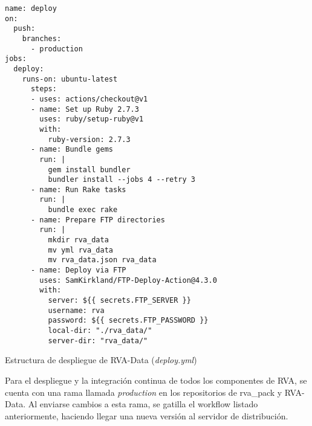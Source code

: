 \begin{longlisting}
  \begin{verbatim}  
name: deploy
on:
  push:
    branches:
      - production
jobs:
  deploy:
    runs-on: ubuntu-latest
      steps:
      - uses: actions/checkout@v1
      - name: Set up Ruby 2.7.3
        uses: ruby/setup-ruby@v1
        with:
          ruby-version: 2.7.3
      - name: Bundle gems
        run: |
          gem install bundler
          bundler install --jobs 4 --retry 3
      - name: Run Rake tasks
        run: |
          bundle exec rake
      - name: Prepare FTP directories
        run: |
          mkdir rva_data
          mv yml rva_data
          mv rva_data.json rva_data
      - name: Deploy via FTP
        uses: SamKirkland/FTP-Deploy-Action@4.3.0
        with:
          server: ${{ secrets.FTP_SERVER }}
          username: rva
          password: ${{ secrets.FTP_PASSWORD }}
          local-dir: "./rva_data/"
          server-dir: "rva_data/"
  \end{verbatim}
  \caption[Workflow de Despleigue]{Estructura de despliegue de RVA-Data (\textit{deploy.yml})}
\end{longlisting}

\newpage

Para el despliegue y la integración continua de todos los componentes de RVA, se cuenta con una rama llamada \textit{production} en los repositorios de rva\_pack y RVA-Data. Al enviarse cambios a esta rama, se gatilla el workflow listado anteriormente, haciendo llegar una nueva versión al servidor de distribución.